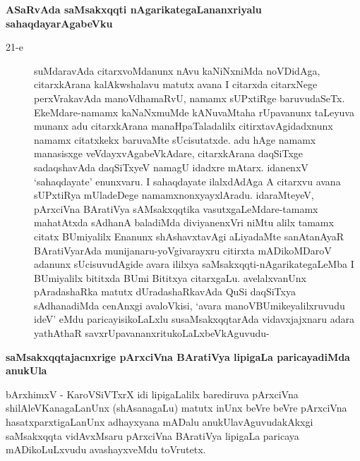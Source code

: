 {\noindent
{\large\bf ASaRvAda saMsakxqqti nAgarikategaLananxriyalu sahaqdayarAgabeVku}}\label{page51}
\begin{description}
\item[21-e] suMdaravAda citarxvoMdanunx nAvu kaNiNxniMda noVDidAga, citarxkArana kalA\-kwshalavu matutx avana I citarxda citarxNege perxVrakavAda manoVdhamaRvU, namamx sUPxtiRge baruvudaSeTx. EkeMdare-\-namamx kaNaNxmuMde kANuvaMtaha rUpavanunx taLeyuva munanx adu citarxkArana manaHpaTala\-dalilx citirxta\-vAgi\-dadxnunx namamx citatxkekx baruvaMte sUcisutatxde. adu hAge namamx manasisxge veVdayxvAgabeVkAdare, citarxkArana daqSiTxge sadaqshavAda daqSiTxyeV namagU idadxre mAtarx. idanenxV `sahaqda\-yate' enunxvaru. I sahaqdayate ilalx\-dAdAga A citarxvu avana sUPxtiRya mUladeDege namamx\-nonxyayxlAradu. idaraMteyeV, pArxciVna BAratiVya sAMsakxqqtika vasutxgaLeMdare-tamamx maha\-tAtxda sAdhanA baladiMda diviyanenxVri niMtu alilx tamamx citatx BUmiyalilx Enanunx shAshavxtavAgi aLiya\-daMte sanAtanAyaR BAratiVyarAda muni\-janaru-yoVgivarayxru citirxta mADikoMDaroV adanunx sUcisuvudAgide avara ililxya saMsakxqqti-nAgarikategaLeMba I BUmiyalilx bititxda BUmi Bititxya citarxgaLu. avelalxvanUnx pAradashaRka matutx dUradashaRkavAda QuSi daqSiTxya sAdhanadiMda cenAnxgi avaloVkisi, `avara manoVBUmikeyalilxruvudu ideV' eMdu paricayisikoLaLxlu susaMsakxqqtarAda vidavxjajxnaru adara yathAthaR savxrUpavananxritukoLaLxbeVkAguvudu-
\end{description}
{\noindent
{\large\bf saMsakxqqtajacnxrige pArxciVna BAratiVya lipigaLa paricayadiMda anukUla}}
\medskip

\noindent
bArxhimxV - KaroVSiVTxrX idi lipigaLalilx barediruva pArxciVna shilAleVKanagaLanUnx (shAsanagaLu) matutx inUnx beVre beVre pArxciVna hasatxparxtigaLanUnx adhayxyana mADalu anukUlavAguvudakAkxgi saMsakxqqta vidAvxM\-saru pArxciVna BAratiVya lipigaLa paricaya mADikoLuLxvudu avashayxveMdu toVrutetx.

